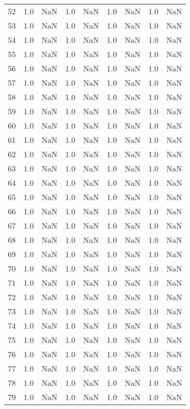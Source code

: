 \begin{tabular}{lrrrrrrrr}
52 & 1.0 & NaN & 1.0 & NaN & 1.0 & NaN & 1.0 & NaN \\
53 & 1.0 & NaN & 1.0 & NaN & 1.0 & NaN & 1.0 & NaN \\
54 & 1.0 & NaN & 1.0 & NaN & 1.0 & NaN & 1.0 & NaN \\
55 & 1.0 & NaN & 1.0 & NaN & 1.0 & NaN & 1.0 & NaN \\
56 & 1.0 & NaN & 1.0 & NaN & 1.0 & NaN & 1.0 & NaN \\
57 & 1.0 & NaN & 1.0 & NaN & 1.0 & NaN & 1.0 & NaN \\
58 & 1.0 & NaN & 1.0 & NaN & 1.0 & NaN & 1.0 & NaN \\
59 & 1.0 & NaN & 1.0 & NaN & 1.0 & NaN & 1.0 & NaN \\
60 & 1.0 & NaN & 1.0 & NaN & 1.0 & NaN & 1.0 & NaN \\
61 & 1.0 & NaN & 1.0 & NaN & 1.0 & NaN & 1.0 & NaN \\
62 & 1.0 & NaN & 1.0 & NaN & 1.0 & NaN & 1.0 & NaN \\
63 & 1.0 & NaN & 1.0 & NaN & 1.0 & NaN & 1.0 & NaN \\
64 & 1.0 & NaN & 1.0 & NaN & 1.0 & NaN & 1.0 & NaN \\
65 & 1.0 & NaN & 1.0 & NaN & 1.0 & NaN & 1.0 & NaN \\
66 & 1.0 & NaN & 1.0 & NaN & 1.0 & NaN & 1.0 & NaN \\
67 & 1.0 & NaN & 1.0 & NaN & 1.0 & NaN & 1.0 & NaN \\
68 & 1.0 & NaN & 1.0 & NaN & 1.0 & NaN & 1.0 & NaN \\
69 & 1.0 & NaN & 1.0 & NaN & 1.0 & NaN & 1.0 & NaN \\
70 & 1.0 & NaN & 1.0 & NaN & 1.0 & NaN & 1.0 & NaN \\
71 & 1.0 & NaN & 1.0 & NaN & 1.0 & NaN & 1.0 & NaN \\
72 & 1.0 & NaN & 1.0 & NaN & 1.0 & NaN & 1.0 & NaN \\
73 & 1.0 & NaN & 1.0 & NaN & 1.0 & NaN & 1.0 & NaN \\
74 & 1.0 & NaN & 1.0 & NaN & 1.0 & NaN & 1.0 & NaN \\
75 & 1.0 & NaN & 1.0 & NaN & 1.0 & NaN & 1.0 & NaN \\
76 & 1.0 & NaN & 1.0 & NaN & 1.0 & NaN & 1.0 & NaN \\
77 & 1.0 & NaN & 1.0 & NaN & 1.0 & NaN & 1.0 & NaN \\
78 & 1.0 & NaN & 1.0 & NaN & 1.0 & NaN & 1.0 & NaN \\
79 & 1.0 & NaN & 1.0 & NaN & 1.0 & NaN & 1.0 & NaN \\

\end{tabular}
